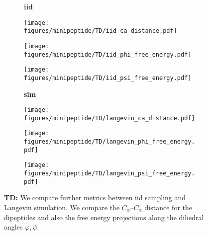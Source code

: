 \begin{figure}
    \centering
    \begin{minipage}{\textwidth}
        \centering
        \begin{subfigure}[c]{0.08\textwidth}
            \textbf{iid}
        \end{subfigure}
        \begin{subfigure}[c]{0.2\textwidth}
            \centering
            \texttt{[image: figures/minipeptide/TD/iid\_ca\_distance.pdf]}            
        \end{subfigure}
        \hspace{0.5cm}
        \begin{subfigure}[c]{0.2\textwidth}
            \centering
            \texttt{[image: figures/minipeptide/TD/iid\_phi\_free\_energy.pdf]}
        \end{subfigure}
        \hspace{0.5cm}
        \begin{subfigure}[c]{0.2\textwidth}
            \centering
            \texttt{[image: figures/minipeptide/TD/iid\_psi\_free\_energy.pdf]}
        \end{subfigure}
    \end{minipage}
    \vspace{0.5cm}
    \begin{minipage}{\textwidth}
        \centering
        \begin{subfigure}[c]{0.08\textwidth}
            \vspace{-0.5cm}
            \textbf{sim}
        \end{subfigure}
        \begin{subfigure}[c]{0.2\textwidth}
            \centering
            \texttt{[image: figures/minipeptide/TD/langevin\_ca\_distance.pdf]}
        \end{subfigure}
        \hspace{0.5cm}
        \begin{subfigure}[c]{0.2\textwidth}
            \centering
            \texttt{[image: figures/minipeptide/TD/langevin\_phi\_free\_energy.pdf]}
        \end{subfigure}
        \hspace{0.5cm}
        \begin{subfigure}[c]{0.2\textwidth}
            \centering
            \texttt{[image: figures/minipeptide/TD/langevin\_psi\_free\_energy.pdf]}
        \end{subfigure}
    \end{minipage}
    \caption{\textbf{TD:} We compare further metrics between iid sampling and Langevin simulation. We compare the $C_\alpha$--$C_\alpha$ distance for the dipeptides and also the free energy projections along the dihedral angles $\varphi, \psi$.}
    \label{fig:minipeptide-td-more-metrics}
\end{figure}

